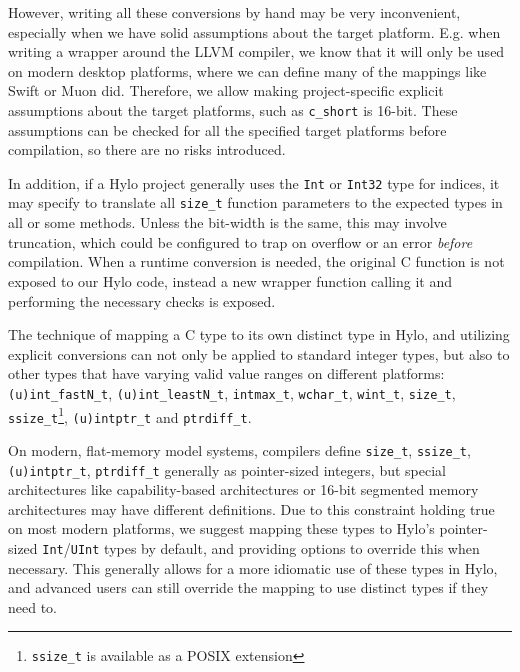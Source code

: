 However, writing all these conversions by hand may be very inconvenient, especially when we have solid assumptions about the target platform. E.g. when writing a wrapper around the LLVM compiler, we know that it will only be used on modern desktop platforms, where we can define many of the mappings like Swift or Muon did. Therefore, we allow making project-specific explicit assumptions about the target platforms, such as \texttt{c\_short} is 16-bit. These assumptions can be checked for all the specified target platforms before compilation, so there are no risks introduced.

In addition, if a Hylo project generally uses the \texttt{Int} or \texttt{Int32} type for indices, it may specify to translate all \texttt{size\_t} function parameters to the expected types in all or some methods. Unless the bit-width is the same, this may involve truncation, which could be configured to trap on overflow or an error \emph{before} compilation. When a runtime conversion is needed, the original C function is not exposed to our Hylo code, instead a new wrapper function calling it and performing the necessary checks is exposed.

The technique of mapping a C type to its own distinct type in Hylo, and utilizing explicit conversions can not only be applied to standard integer types, but also to other types that have varying valid value ranges on different platforms: \texttt{(u)int\_fastN\_t}, \texttt{(u)int\_leastN\_t}, \texttt{intmax\_t}, \texttt{wchar\_t}, \texttt{wint\_t}, \texttt{size\_t}, \texttt{ssize\_t}\footnote{\texttt{ssize\_t} is available as a POSIX extension}, \texttt{(u)intptr\_t} and \texttt{ptrdiff\_t}.

On modern, flat-memory model systems, compilers define \texttt{size\_t}, \texttt{ssize\_t}, \texttt{(u)intptr\_t}, \texttt{ptrdiff\_t} generally as pointer-sized integers, but special architectures like capability-based architectures\cite{cheri-intro}\cite{hackernews-rust-cheri} or 16-bit segmented memory architectures\cite{arch16-bit} may have different definitions. Due to this constraint holding true on most modern platforms, we suggest mapping these types to Hylo's pointer-sized \texttt{Int}/\texttt{UInt} types by default, and providing options to override this when necessary. This generally allows for a more idiomatic use of these types in Hylo, and advanced users can still override the mapping to use distinct types if they need to.

